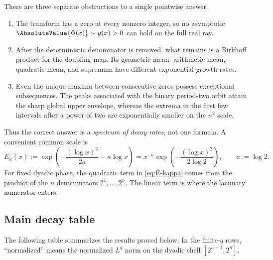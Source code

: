 \documentclass[11pt,oneside]{article}
\theoremstyle{definition}
\theoremstyle{remark}
\newcommand{\Phiup}{\Phi}
\begin{document}
There are three separate obstructions to a single pointwise answer.

\begin{enumerate}
\item The transform has a zero at every nonzero integer, so no asymptotic
      $\AbsoluteValue{\Phiup(x)}\sim g(x)>0$ can hold on the full real ray.
\item After the deterministic denominator is removed, what remains is a Birkhoff product
      for the doubling map.  Its geometric mean, arithmetic mean, quadratic mean, and
      supremum have different exponential growth rates.
\item Even the unique maxima between consecutive zeros possess exceptional subsequences.
      The peaks associated with the binary period-two orbit attain the sharp global upper
      envelope, whereas the extrema in the first few intervals after a power of two are
      exponentially smaller on the $n^2$ scale.
\end{enumerate}

Thus the correct answer is a \emph{spectrum of decay rates}, not one formula.  A convenient
common scale is
\begin{equation}
 E_\kappa(x)
 :=\exp\!\left(-\frac{(\log x)^2}{2a}-\kappa\log x\right)
 =x^{-\kappa}\exp\!\left(-\frac{(\log x)^2}{2\log2}\right),
 \qquad a:=\log2.
 \label{eq:E-kappa}
\end{equation}
For fixed dyadic phase, the quadratic term in \eqref{eq:E-kappa} comes from the product of
the $n$ denominators $2^1,\dots,2^n$.  The linear term is where the lacunary numerator
enters.

\subsection{Main decay table}
\label{subsec:main-table}

The following table summarizes the results proved below.  In the finite-$q$ rows,
``normalized'' means the normalized $L^q$ norm on the dyadic shell
$[2^{n-1},2^n]$.
\end{document}
